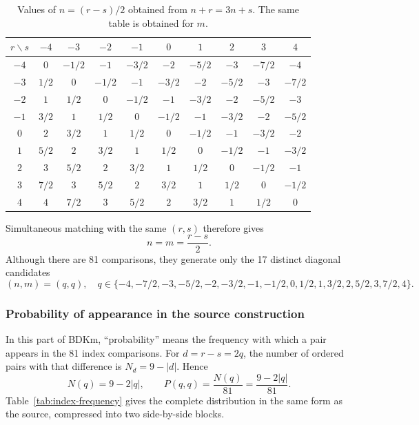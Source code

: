 \documentclass[11pt]{article}
\begin{document}
\begin{table}[htbp]
\centering
\caption{Values of $n=(r-s)/2$ obtained from $n+r=3n+s$.  The same table is
obtained for $m$.}
\label{tab:index-comparisons}
\scriptsize
\setlength{\tabcolsep}{4.0pt}
\begin{tabular}{c*{9}{c}}
\toprule
$r\backslash s$ & $-4$ & $-3$ & $-2$ & $-1$ & $0$ & $1$ & $2$ & $3$ & $4$\\
\midrule
$-4$ & $0$ & $-1/2$ & $-1$ & $-3/2$ & $-2$ & $-5/2$ & $-3$ & $-7/2$ & $-4$\\
$-3$ & $1/2$ & $0$ & $-1/2$ & $-1$ & $-3/2$ & $-2$ & $-5/2$ & $-3$ & $-7/2$\\
$-2$ & $1$ & $1/2$ & $0$ & $-1/2$ & $-1$ & $-3/2$ & $-2$ & $-5/2$ & $-3$\\
$-1$ & $3/2$ & $1$ & $1/2$ & $0$ & $-1/2$ & $-1$ & $-3/2$ & $-2$ & $-5/2$\\
$0$  & $2$ & $3/2$ & $1$ & $1/2$ & $0$ & $-1/2$ & $-1$ & $-3/2$ & $-2$\\
$1$  & $5/2$ & $2$ & $3/2$ & $1$ & $1/2$ & $0$ & $-1/2$ & $-1$ & $-3/2$\\
$2$  & $3$ & $5/2$ & $2$ & $3/2$ & $1$ & $1/2$ & $0$ & $-1/2$ & $-1$\\
$3$  & $7/2$ & $3$ & $5/2$ & $2$ & $3/2$ & $1$ & $1/2$ & $0$ & $-1/2$\\
$4$  & $4$ & $7/2$ & $3$ & $5/2$ & $2$ & $3/2$ & $1$ & $1/2$ & $0$\\
\bottomrule
\end{tabular}
\end{table}

Simultaneous matching with the same $(r,s)$ therefore gives
\begin{equation}
n=m=\frac{r-s}{2}.
\label{eq:index-match}
\end{equation}
Although there are 81 comparisons, they generate only the 17 distinct
diagonal candidates
\begin{equation}
(n,m)=(q,q),\quad
q\in\{-4,-7/2,-3,-5/2,-2,-3/2,-1,-1/2,0,
1/2,1,3/2,2,5/2,3,7/2,4\}.
\label{eq:q-set}
\end{equation}

\subsubsection{Probability of appearance in the source construction}

In this part of BDKm, ``probability'' means the frequency with which a pair
appears in the 81 index comparisons.  For $d=r-s=2q$, the number of ordered
pairs with that difference is $N_d=9-|d|$.  Hence
\begin{equation}
N(q)=9-2|q|,\qquad P(q,q)=\frac{N(q)}{81}
=\frac{9-2|q|}{81}.
\label{eq:index-frequency}
\end{equation}
Table~\ref{tab:index-frequency} gives the complete distribution in the same
form as the source, compressed into two side-by-side blocks.
\end{document}
